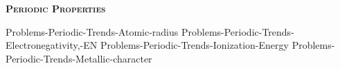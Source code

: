 \documentclass[main.tex]{subfiles}
\begin{document}
\begin{multicols*}{2}
{{\raggedright\textsc{\textbf{Periodic Properties }}\par}
  {Problems-Periodic-Trends-Atomic-radius}
  {Problems-Periodic-Trends-Electronegativity,-EN}
  {Problems-Periodic-Trends-Ionization-Energy}
  {Problems-Periodic-Trends-Metallic-character}
\renewcommand\chapterlabel{Ch-Table}
}{}

\end{multicols*} \iftoggle{showfinalanswers}{
\newpage\fancyhfoffset[E,O]{0pt}
\begin{answerbox}
\begin{answersenvironment}
 \begin{localsize}{10}
{ \checkoddpage\ifoddpage    \else   \clearpage\thispagestyle{empty}\mbox{}\clearpage\fi
\Large \bf Answers}
\SetupExSheets{ headings = inline-nr , counter-format = qu) ,}
\providetoggle{printOddAnswers}\settoggle{printOddAnswers}{\printOddAnswers}\iftoggle{printOddAnswers}{\printsolutions[section] }{\printsolutions}
  \vspace{20cm}
 \end{localsize}
 \end{answersenvironment}
\end{answerbox}
}{}
\checkoddpage\ifoddpage   \clearpage\thispagestyle{empty}\mbox{}\clearpage \else   \fi
\end{document}
